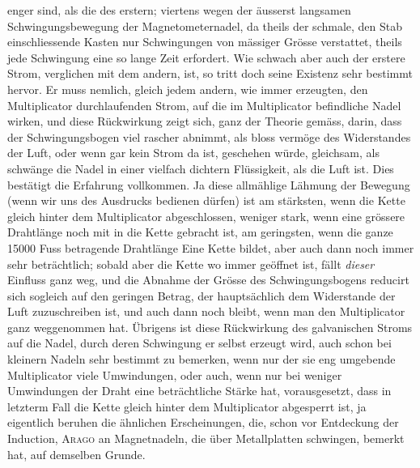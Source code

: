 \noindent enger sind, als die des erstern; viertens wegen der äusserst langsamen Schwingungsbewegung der Magnetometernadel, da theils der schmale, den Stab einschliessende Kasten nur Schwingungen von mässiger Grösse verstattet, theils jede Schwingung eine so lange Zeit erfordert. Wie schwach aber auch der erstere Strom, verglichen mit dem andern, ist, so tritt doch seine Existenz sehr bestimmt hervor. Er muss nemlich, gleich jedem andern, wie immer erzeugten, den Multiplicator durchlaufenden Strom, auf die im Multiplicator befindliche Nadel wirken, und diese Rückwirkung zeigt sich, ganz der Theorie gemäss, darin, dass der Schwingungsbogen viel rascher abnimmt, als bloss vermöge des Widerstandes der Luft, oder wenn gar kein Strom da ist, geschehen würde, gleichsam, als schwänge die Nadel in einer vielfach dichtern Flüssigkeit, als die Luft ist. Dies bestätigt die Erfahrung vollkommen. Ja diese allmählige Lähmung der Bewegung (wenn wir uns des Ausdrucks bedienen dürfen) ist am stärksten, wenn die Kette gleich hinter dem Multiplicator abgeschlossen, weniger stark, wenn eine grössere Drahtlänge noch mit in die Kette gebracht ist, am geringsten, wenn die ganze 15000 Fuss betragende Drahtlänge Eine Kette bildet, aber auch dann noch immer sehr beträchtlich; sobald aber die Kette wo immer geöffnet ist, fällt \textit{dieser} Einfluss ganz weg, und die Abnahme der Grösse des Schwingungsbogens reducirt sich sogleich auf den geringen Betrag, der hauptsächlich dem Widerstande der Luft zuzuschreiben ist, und auch dann noch bleibt, wenn man den Multiplicator ganz weggenommen hat. Übrigens ist diese Rückwirkung des galvanischen Stroms auf die Nadel, durch deren Schwingung er selbst erzeugt wird, auch schon bei kleinern Nadeln sehr bestimmt zu bemerken, wenn nur der sie eng umgebende Multiplicator viele Umwindungen, oder auch, wenn nur bei weniger Umwindungen der Draht eine beträchtliche Stärke hat, vorausgesetzt, dass in letzterm Fall die Kette gleich hinter dem Multiplicator abgesperrt ist, ja eigentlich beruhen die ähnlichen Erscheinungen, die, schon vor Entdeckung der Induction, \textsc{Arago} an Magnetnadeln, die über Metallplatten schwingen, bemerkt hat, auf demselben Grunde.

